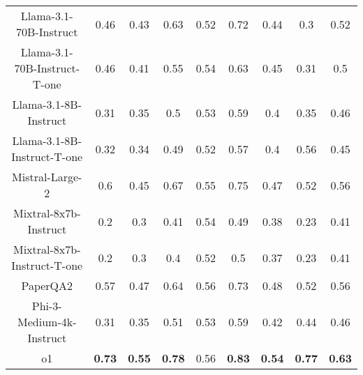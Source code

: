 \begin{tabular}{ccccccccc}
Llama-3.1-70B-Instruct & 0.46 & 0.43 & 0.63 & 0.52 & 0.72 & 0.44 & 0.3 & 0.52 \\
Llama-3.1-70B-Instruct-T-one & 0.46 & 0.41 & 0.55 & 0.54 & 0.63 & 0.45 & 0.31 & 0.5 \\
Llama-3.1-8B-Instruct & 0.31 & 0.35 & 0.5 & 0.53 & 0.59 & 0.4 & 0.35 & 0.46 \\
Llama-3.1-8B-Instruct-T-one & 0.32 & 0.34 & 0.49 & 0.52 & 0.57 & 0.4 & 0.56 & 0.45 \\
Mistral-Large-2 & 0.6 & 0.45 & 0.67 & 0.55 & 0.75 & 0.47 & 0.52 & 0.56 \\
Mixtral-8x7b-Instruct & 0.2 & 0.3 & 0.41 & 0.54 & 0.49 & 0.38 & 0.23 & 0.41 \\
Mixtral-8x7b-Instruct-T-one & 0.2 & 0.3 & 0.4 & 0.52 & 0.5 & 0.37 & 0.23 & 0.41 \\
PaperQA2 & 0.57 & 0.47 & 0.64 & 0.56 & 0.73 & 0.48 & 0.52 & 0.56 \\
Phi-3-Medium-4k-Instruct & 0.31 & 0.35 & 0.51 & 0.53 & 0.59 & 0.42 & 0.44 & 0.46 \\
o1 & \textbf{0.73} & \textbf{0.55} & \textbf{0.78} & 0.56 & \textbf{0.83} & \textbf{0.54} & \textbf{0.77} & \textbf{0.63} \\
\bottomrule
\end{tabular}
